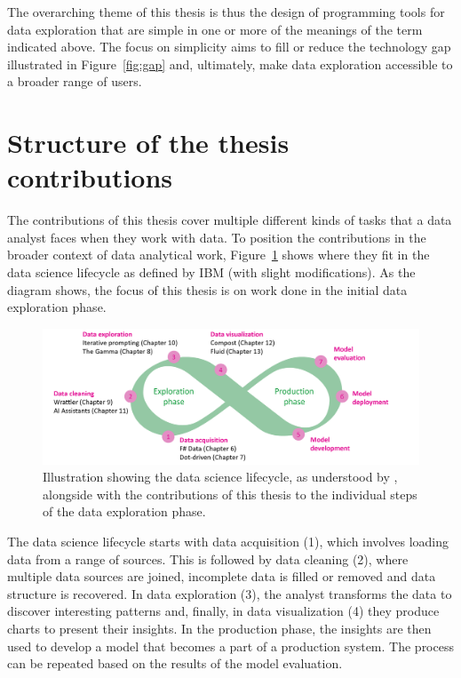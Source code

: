 \documentclass[fleqn,11pt]{report}
\theoremstyle{definition}
\begin{document}
The overarching theme of this thesis is thus the design of programming tools for data exploration
that are simple in one or more of the meanings of the term indicated above. The focus on simplicity
aims to fill or reduce the technology gap illustrated in Figure~\ref{fig:gap} and, ultimately,
make data exploration accessible to a broader range of users.

\section{Structure of the thesis contributions}

The contributions of this thesis cover multiple different kinds of tasks that a data analyst
faces when they work with data. To position the contributions in the broader context of data
analytical work, Figure~\ref{fig:lifecycle} shows where they fit in the data science lifecycle
as defined by IBM (with slight modifications). As the diagram shows, the focus of this thesis is on work done in the
initial data exploration phase.

\begin{figure}[h]
  \vspace{1em}
  \includegraphics[scale=0.2]{img/lifecycle.png}
  \vspace{-1em}
  \caption{Illustration showing the data science lifecycle, as understood by \cite{ibm-2020-lifecycle},
  alongside with the contributions of this thesis to the individual steps of the data exploration phase.}
  \label{fig:lifecycle}
\end{figure}

The data science lifecycle starts with data acquisition (1), which involves loading
data from a range of sources. This is followed by data cleaning (2), where multiple data sources
are joined, incomplete data is filled or removed and data structure is recovered.
In data exploration (3), the analyst transforms the data to discover
interesting patterns and, finally, in data visualization (4) they produce charts to present
their insights. In the production phase, the insights are then used to develop a model
that becomes a part of a production system. The process can be repeated based on the results
of the model evaluation.
\end{document}
